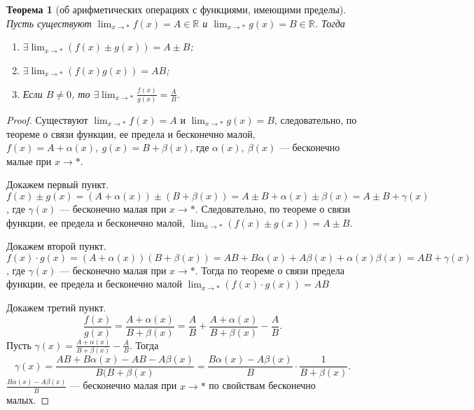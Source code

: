 \documentclass[a4paper,12pt]{article} %
\newtheorem{theorem}{Теорема}[section]
\theoremstyle{remark}
\theoremstyle{definition}
\begin{document}
\begin{theorem}[об арифметических операциях с функциями, имеющими пределы]
	Пусть существуют $\displaystyle \lim_{x \to *} f(x) = A \in  \mathbb{R}$ и $\displaystyle \lim_{x \to *} g(x) = B\in  \mathbb{R}$.
	Тогда
	\begin{enumerate}
		\item $\displaystyle \exists \lim_{x \to *} (f(x) \pm g(x)) = A\pm B$;
		\item $\displaystyle \exists \lim_{x \to *} (f(x) g(x)) = AB$;
		\item Если $B \neq 0$, то $\displaystyle \exists  \lim_{x \to *} \frac{f(x)}{g(x)} = \frac{A}{B}$.
	\end{enumerate}
\end{theorem}
\begin{proof}
    Существуют $\displaystyle \lim_{x \to *} f(x) = A$ и $\displaystyle \lim_{x \to *} g(x) = B$, следовательно, по теореме о связи функции, ее предела и бесконечно малой, $f(x) = A + \alpha(x), \ g(x) = B + \beta(x)$, где $\alpha(x), \ \beta(x)$ --- бесконечно малые при $x\to *$.
	
    Докажем первый пункт. $f(x)\pm g(x) = (A + \alpha(x)) \pm (B+ \beta(x)) = A \pm B +\alpha(x) \pm \beta(x) = A \pm B + \gamma(x)$, где $\gamma(x)$ --- бесконечно малая при  $x \to *$. Следовательно, по теореме о связи функции, ее предела и бесконечно малой, $\displaystyle \lim_{x \to *} (f(x) \pm g(x)) = A \pm B.$

    Докажем второй пункт. $f(x) \cdot  g(x) = (A + \alpha(x))(B+\beta(x))= AB+B\alpha(x)+A\beta(x) + \alpha(x)\beta(x) = AB + \gamma(x)$, где $\gamma(x)$ --- бесконечно малая при $x\to *$. Тогда по теореме о связи предела функции, ее предела и бесконечно малой $\displaystyle \lim_{x \to *} (f(x)\cdot g(x)) = AB$

    Докажем третий пункт. 
    \[\frac{f(x)}{g(x)} = \frac{A+\alpha(x)}{B+\beta(x)} = \frac{A}{B} + \frac{A+\alpha(x)}{B + \beta(x)} - \frac{A}{B}.\] 
    Пусть $\displaystyle \gamma(x) = \frac{A+\alpha(x)}{B + \beta(x)} - \frac{A}{B}$. Тогда 
    \[\gamma(x) = \frac{AB+B\alpha(x)-AB-A\beta(x)}{B(B+\beta(x)} = \frac{B\alpha(x)-A\beta(x)}{B} \cdot \frac{1}{B+\beta(x)}.\] 
	$\displaystyle \frac{B\alpha(x)-A\beta(x)}{B}$ --- бесконечно малая при $x \to  *$ по свойствам бесконечно малых.
			

\end{proof}
\end{document}
